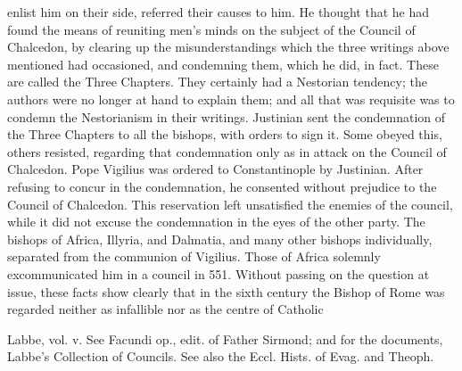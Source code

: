 enlist him on their side, referred their causes to him. He thought that he had found the means of reuniting men's minds on the subject of the Council of Chalcedon, by clearing up the misunderstandings which the three writings above mentioned had occasioned, and condemning them, which he did, in fact. These are called the Three Chapters. They certainly had a Nestorian tendency; the authors were no longer at hand to explain them; and all that was requisite was to condemn the Nestorianism in their writings. Justinian sent the condemnation of the Three Chapters to all the bishops, with orders to sign it. Some obeyed this, others resisted, regarding that condemnation only as in attack on the Council of Chalcedon. Pope Vigilius was ordered to Constantinople by Justinian. After refusing to concur in the condemnation, he consented without prejudice to the Council of Chalcedon. This reservation left unsatisfied the enemies of the council, while it did not excuse the condemnation in the eyes of the other party. The bishops of Africa, Illyria, and Dalmatia, and many other bishops individually, separated from the communion of Vigilius. Those of Africa solemnly excommunicated him in a council in 551. Without passing on the question at issue, these facts show clearly that in the sixth century the Bishop of Rome was regarded neither as infallible nor as the centre of Catholic

Labbe, vol. v. See Facundi op., edit. of Father Sirmond; and for the documents, Labbe’s Collection of Councils. See also the Eccl. Hists. of Evag. and Theoph.

